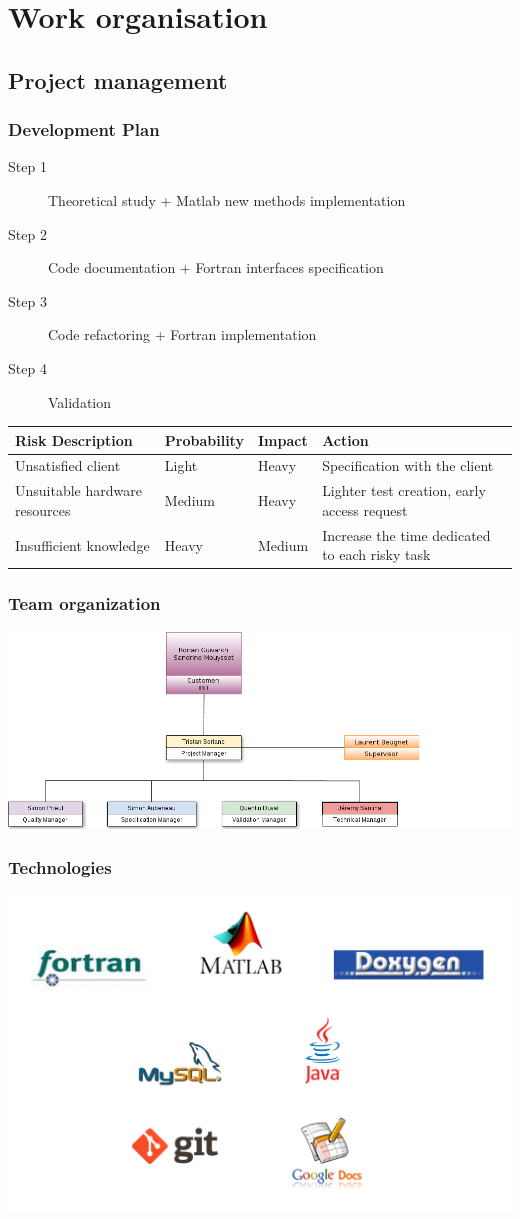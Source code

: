 \documentclass[10p]{beamer}
\begin{document}
\section{Work organisation}
\subsection{Project management}
\begin{frame}
\small
\frametitle{Development Plan}
\begin{description}
\item [Step 1] Theoretical study + Matlab new methods implementation
\item [Step 2] Code documentation + Fortran interfaces specification
\item [Step 3] Code refactoring + Fortran implementation
\item [Step 4] Validation
\end{description}
\tiny
\begin{tabular}{|l|l|l|l|}
\hline
\textbf{Risk Description} & \textbf{Probability} & \textbf{Impact} & \textbf{Action}
\\
\hline
Unsatisfied client & Light & Heavy & Specification with the client
\\
\hline
Unsuitable hardware resources & Medium & Heavy & Lighter test creation, early access request
\\
\hline
Insufficient knowledge & Heavy & Medium & Increase the time dedicated to each risky task
\\
\hline
\end{tabular}
\end{frame}
\begin{frame}
\frametitle{Team organization}
\includegraphics[width=\textwidth]{Image/organisation.png}
\end{frame}
\begin{frame}
\frametitle{Technologies}
\includegraphics[width=\textwidth]{Image/logos.png}
\end{frame}
\end{document}

